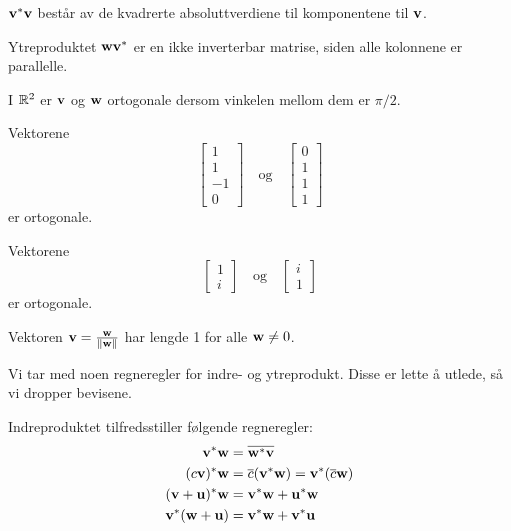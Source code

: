  
\begin{merkx}
$\mathbf{v}^*\mathbf{v}$ består av de kvadrerte absoluttverdiene til komponentene til $\mathbf{v}$. 
\end{merkx}
 
 \begin{merkx}
 Ytreproduktet $ \mathbf{w} \mathbf{v}^*$ er en ikke inverterbar matrise, siden alle kolonnene er parallelle.
 \end{merkx}
 
 

 \begin{ex}
I $\mathbb{R}^2$ er $\mathbf{v}$ og $\mathbf{w}$ ortogonale dersom vinkelen mellom dem er $\pi/2$.
\end{ex}


 \begin{ex}
 Vektorene 
 \[
 \begin{bmatrix}
 1 \\ 
 1 \\
 -1\\
 0
 \end{bmatrix}
 \quad
 \text{og}
 \quad
  \begin{bmatrix}
 0 \\ 
 1 \\
 1\\
 1
 \end{bmatrix}
\]
er ortogonale. 
 \end{ex}

 \begin{ex}
 Vektorene 
 \[
 \begin{bmatrix}
 1 \\ 
 i 
 \end{bmatrix}
 \quad
 \text{og}
 \quad
  \begin{bmatrix}
 i \\ 
1
 \end{bmatrix}
\]
er ortogonale. 
 \end{ex}


 \begin{ex}
 Vektoren $\mathbf{v}=\frac{\mathbf{w}}{\|\mathbf{w}\|}$ har lengde 1 for alle $\mathbf{w} \neq 0$.
 \end{ex}
 
 Vi tar med noen regneregler for indre- og ytreprodukt. Disse er lette å utlede, så vi dropper bevisene.
\begin{thm}
Indreproduktet tilfredsstiller følgende regneregler:
\begin{align*}
 \mathbf{v} ^* \mathbf{w}&=\overline{\mathbf{w} ^* \mathbf{v}} \\
( c\mathbf{v} )^* \mathbf{w}&=\overline{c}(\mathbf{v} ^* \mathbf{w} ) = \mathbf{v} ^* (\overline c\mathbf{w}) \\
 (\mathbf{v}+\mathbf{u}) ^* \mathbf{w}&= \mathbf{v} ^* \mathbf{w}+ \mathbf{u} ^* \mathbf{w} \\
  \mathbf{v} ^* (\mathbf{w}+\mathbf{u})&= \mathbf{v} ^* \mathbf{w}+ \mathbf{v} ^* \mathbf{u}
\end{align*}
\end{thm}
 
